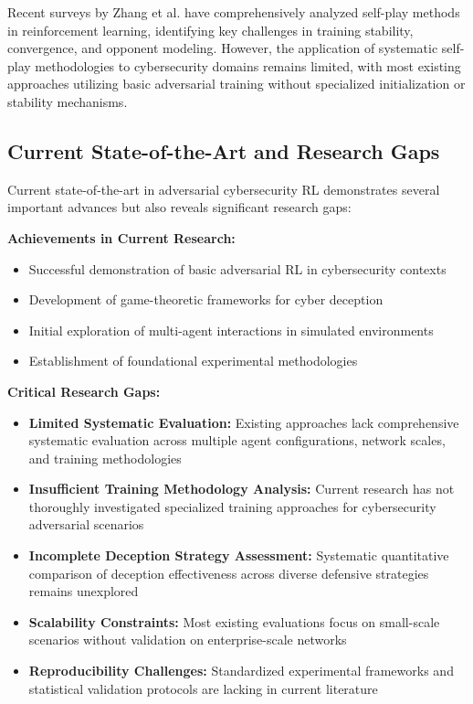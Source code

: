 \documentclass[12pt]{article}
\theoremstyle{definition}
\theoremstyle{plain}
\begin{document}
Recent surveys by Zhang et al. \cite{zhang2024survey} have comprehensively analyzed self-play methods in reinforcement learning, identifying key challenges in training stability, convergence, and opponent modeling. However, the application of systematic self-play methodologies to cybersecurity domains remains limited, with most existing approaches utilizing basic adversarial training without specialized initialization or stability mechanisms.

\subsection{Current State-of-the-Art and Research Gaps}

Current state-of-the-art in adversarial cybersecurity RL demonstrates several important advances but also reveals significant research gaps:

\textbf{Achievements in Current Research:}
\begin{itemize}
\item Successful demonstration of basic adversarial RL in cybersecurity contexts
\item Development of game-theoretic frameworks for cyber deception
\item Initial exploration of multi-agent interactions in simulated environments
\item Establishment of foundational experimental methodologies
\end{itemize}

\textbf{Critical Research Gaps:}
\begin{itemize}
\item \textbf{Limited Systematic Evaluation:} Existing approaches lack comprehensive systematic evaluation across multiple agent configurations, network scales, and training methodologies
\item \textbf{Insufficient Training Methodology Analysis:} Current research has not thoroughly investigated specialized training approaches for cybersecurity adversarial scenarios
\item \textbf{Incomplete Deception Strategy Assessment:} Systematic quantitative comparison of deception effectiveness across diverse defensive strategies remains unexplored
\item \textbf{Scalability Constraints:} Most existing evaluations focus on small-scale scenarios without validation on enterprise-scale networks
\item \textbf{Reproducibility Challenges:} Standardized experimental frameworks and statistical validation protocols are lacking in current literature
\end{itemize}
\end{document}
